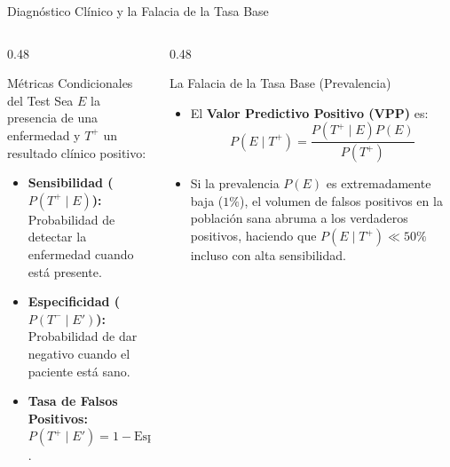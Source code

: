 \documentclass[10pt, aspectratio=169]{beamer}
\begin{document}
\begin{frame}{Diagnóstico Clínico y la Falacia de la Tasa Base}
  \begin{columns}[T]
    \begin{column}{0.48\textwidth}
      \begin{block}{Métricas Condicionales del Test}
        \small
        Sea $E$ la presencia de una enfermedad y $T^+$ un resultado clínico positivo:
        \begin{itemize}\itemsep=0.1cm
          \item \textbf{Sensibilidad ($P(T^+ \mid E)$):} Probabilidad de detectar la enfermedad cuando está presente.
          \item \textbf{Especificidad ($P(T^- \mid E')$):} Probabilidad de dar negativo cuando el paciente está sano.
          \item \textbf{Tasa de Falsos Positivos:} $P(T^+ \mid E') = 1 - \text{Especificidad}$.
        \end{itemize}
      \end{block}
    \end{column}
    \begin{column}{0.48\textwidth}
      \begin{alertblock}{La Falacia de la Tasa Base (Prevalencia)}
        \small
        \begin{itemize}\itemsep=0.1cm
          \item El \textbf{Valor Predictivo Positivo (VPP)} es:
          $$P(E \mid T^+) = \frac{P(T^+ \mid E)P(E)}{P(T^+)}$$
          \item Si la prevalencia $P(E)$ es extremadamente baja ($1\%$), el volumen de falsos positivos en la población sana abruma a los verdaderos positivos, haciendo que $P(E \mid T^+) \ll 50\%$ incluso con alta sensibilidad.
        \end{itemize}
      \end{alertblock}
    \end{column}
  \end{columns}
\end{frame}
\end{document}
